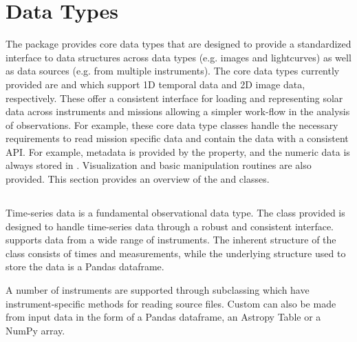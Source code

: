 \section{Data Types}
\label{sec:data_types}

The \sunpypkg package provides core data types that are designed to provide a standardized interface to data structures across data types (e.g. images and lightcurves) as well as data sources (e.g. from multiple instruments).
The core data types currently provided are \Timeseries and \Map  which support 1D temporal data and 2D image data, respectively.
These offer a consistent interface for loading and representing solar data across instruments and missions allowing a simpler work-flow in the analysis of observations. 
For example, these core data type classes handle the necessary requirements to read mission specific data and contain the data with a consistent API. 
For example, metadata is provided by the  property, and the numeric data is always stored in . 
Visualization and basic manipulation routines are also provided. 
This section provides an overview of the \Timeseries and \Map classes.

\subsection{\Timeseries}
\label{sec:timeseries}
Time-series data is a fundamental observational data type.
The \Timeseries class provided is designed to handle time-series data through a robust and consistent interface. 
\Timeseries supports data from a wide range of instruments.
The inherent structure of the \Timeseries class consists of times and measurements, while the underlying structure used to store the data is a Pandas dataframe. 

A number of instruments are supported through subclassing which have instrument-specific methods for reading source files.
Custom \Timeseries can also be made from input data in the form of a Pandas dataframe, an Astropy Table or a NumPy array.

